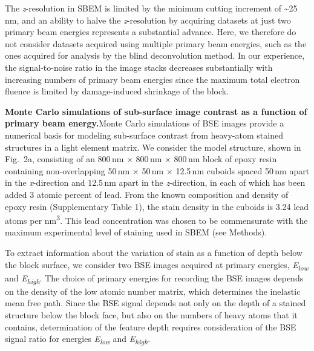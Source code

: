 \documentclass{article}
\begin{document}
The \emph{z}-resolution in SBEM is limited by the minimum cutting increment of \textasciitilde25\,nm, and an ability to halve the \emph{z}-resolution by acquiring datasets at just two primary beam energies represents a substantial advance. Here, we therefore do not consider datasets acquired using multiple primary beam energies, such as the ones acquired for analysis by the blind deconvolution method. In our experience, the signal-to-noise ratio in the image stacks decreases substantially with increasing numbers of primary beam energies since the maximum total electron fluence is limited by damage-induced shrinkage of the block.

\medskip
\noindent\textbf{Monte Carlo simulations of sub-surface image contrast as a function of primary beam energy.}\quad Monte Carlo simulations of BSE images provide a numerical basis for modeling sub-surface contrast from heavy-atom stained structures in a light element matrix. We consider the model structure, shown in Fig.~2a, consisting of an 800\,nm × 800\,nm × 800\,nm block of epoxy resin containing non-overlapping 50\,nm × 50\,nm × 12.5\,nm cuboids spaced 50\,nm apart in the \emph{x}-direction and 12.5\,nm apart in the \emph{z}-direction, in each of which has been added 3 atomic percent of lead. From the known composition and density of epoxy resin (Supplementary Table 1), the stain density in the cuboids is 3.24 lead atoms per nm\textsuperscript{3}. This lead concentration was chosen to be commensurate with the maximum experimental level of staining used in SBEM (see Methods).

To extract information about the variation of stain as a function of depth below the block surface, we consider two BSE images acquired at primary energies, \emph{E}\textsubscript{\emph{low}} and \emph{E}\textsubscript{\emph{high}}. The choice of primary energies for recording the BSE images depends on the density of the low atomic number matrix, which determines the inelastic mean free path. Since the BSE signal depends not only on the depth of a stained structure below the block face, but also on the numbers of heavy atoms that it contains, determination of the feature depth requires consideration of the BSE signal ratio for energies \emph{E}\textsubscript{\emph{low}} and \emph{E}\textsubscript{\emph{high}}.
\end{document}
